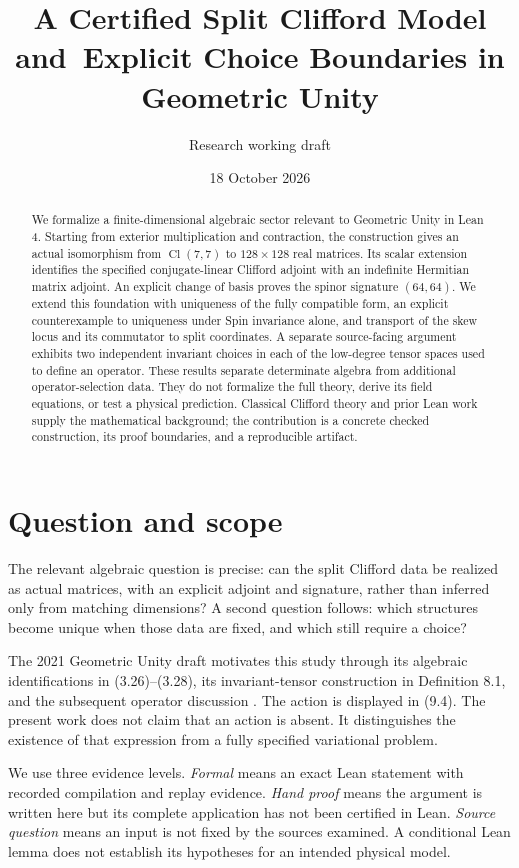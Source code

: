 \documentclass[11pt]{article}
\title{A Certified Split Clifford Model and\ Explicit Choice Boundaries in Geometric Unity}
\author{Research working draft}
\date{18 October 2026}
\newcommand{\Cl}{\operatorname{Cl}}
\begin{document}
\maketitle
\begin{abstract}
We formalize a finite-dimensional algebraic sector relevant to Geometric Unity in Lean 4. Starting from exterior multiplication and contraction, the construction gives an actual isomorphism from $\Cl(7,7)$ to $128\times128$ real matrices. Its scalar extension identifies the specified conjugate-linear Clifford adjoint with an indefinite Hermitian matrix adjoint. An explicit change of basis proves the spinor signature $(64,64)$. We extend this foundation with uniqueness of the fully compatible form, an explicit counterexample to uniqueness under Spin invariance alone, and transport of the skew locus and its commutator to split coordinates. A separate source-facing argument exhibits two independent invariant choices in each of the low-degree tensor spaces used to define an operator. These results separate determinate algebra from additional operator-selection data. They do not formalize the full theory, derive its field equations, or test a physical prediction. Classical Clifford theory and prior Lean work \cite{wieser} supply the mathematical background; the contribution is a concrete checked construction, its proof boundaries, and a reproducible artifact.
\end{abstract}

\section{Question and scope}
The relevant algebraic question is precise: can the split Clifford data be realized as actual matrices, with an explicit adjoint and signature, rather than inferred only from matching dimensions? A second question follows: which structures become unique when those data are fixed, and which still require a choice?

The 2021 Geometric Unity draft motivates this study through its algebraic identifications in (3.26)--(3.28), its invariant-tensor construction in Definition 8.1, and the subsequent operator discussion \cite{gu}. The action is displayed in (9.4). The present work does not claim that an action is absent. It distinguishes the existence of that expression from a fully specified variational problem.

We use three evidence levels. \emph{Formal} means an exact Lean statement with recorded compilation and replay evidence. \emph{Hand proof} means the argument is written here but its complete application has not been certified in Lean. \emph{Source question} means an input is not fixed by the sources examined. A conditional Lean lemma does not establish its hypotheses for an intended physical model.
\end{document}
